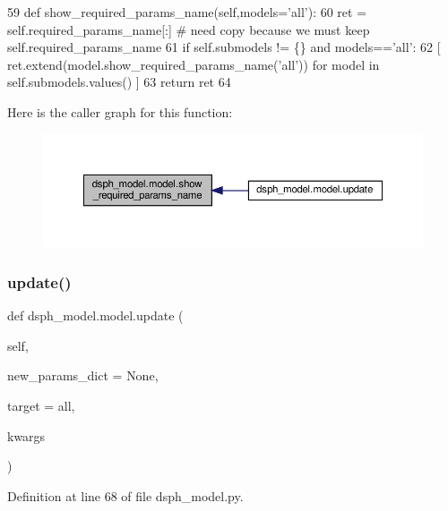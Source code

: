 \begin{DoxyCode}
59     \textcolor{keyword}{def }show\_required\_params\_name(self,models='all'):
60         ret = self.required\_params\_name[:] \textcolor{comment}{# need copy because we must keep self.required\_params\_name}
61         \textcolor{keywordflow}{if} self.submodels != \{\} \textcolor{keywordflow}{and} models==\textcolor{stringliteral}{'all'}:
62             [ ret.extend(model.show\_required\_params\_name(\textcolor{stringliteral}{'all'})) \textcolor{keywordflow}{for} model \textcolor{keywordflow}{in} self.submodels.values() ]
63         \textcolor{keywordflow}{return} ret
64 
\end{DoxyCode}
Here is the caller graph for this function\+:\nopagebreak
\begin{figure}[H]
\begin{center}
\leavevmode
\includegraphics[width=350pt]{d3/da3/classdsph__model_1_1model_a399541f174c45f4f640f7fcbeed99e00_icgraph}
\end{center}
\end{figure}
\mbox{\label{classdsph__model_1_1model_a80a9ec2a3ea7ead926e609f6e3d316f0}} 
\subsubsection{\texorpdfstring{update()}{update()}}
{\footnotesize\ttfamily def dsph\+\_\+model.\+model.\+update (\begin{DoxyParamCaption}\item[{}]{self,  }\item[{}]{new\+\_\+params\+\_\+dict = {\ttfamily None},  }\item[{}]{target = {\ttfamily \textquotesingle{}all\textquotesingle{}},  }\item[{}]{kwargs }\end{DoxyParamCaption})}



Definition at line 68 of file dsph\+\_\+model.\+py.


